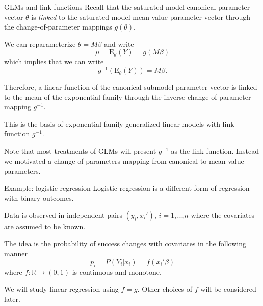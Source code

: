 \documentclass[
  ignorenonframetext,
]{beamer}
\begin{document}
\begin{frame}{GLMs and link functions}
\protect\hypertarget{glms-and-link-functions}{}
Recall that the saturated model canonical parameter vector \(\theta\) is
\emph{linked} to the saturated model mean value parameter vector through
the change-of-parameter mappings \(g(\theta)\).

\vspace{12pt}

We can reparameterize \(\theta = M\beta\) and write \[
 \mu = \text{E}_\theta(Y) = g(M\beta) 
\] which implies that we can write \[
  g^{-1}\left(\text{E}_\theta(Y)\right) = M\beta.
\]
\end{frame}

\begin{frame}{}
\protect\hypertarget{section-4}{}
Therefore, a linear function of the canonical submodel parameter vector
is linked to the mean of the exponential family through the inverse
change-of-parameter mapping \(g^{-1}\).

\vspace{12pt}

This is the basis of exponential family generalized linear models with
link function \(g^{-1}\).

\vspace{12pt}

Note that most treatments of GLMs will present \(g^{-1}\) as the link
function. Instead we motivated a change of parameters mapping from
canonical to mean value parameters.
\end{frame}

\begin{frame}{Example: logistic regression}
\protect\hypertarget{example-logistic-regression}{}
Logistic regression is a different form of regression with binary
outcomes.

\vspace{12pt}

Data is observed in independent pairs \((y_i,x_i')\),
\(i = 1\),\(\ldots\),\(n\) where the covariates are assumed to be known.

\vspace{12pt}

The idea is the probability of success changes with covariates in the
following manner \[
  p_i = P(Y_i|x_i) = f(x_i'\beta)
\] where \(f:\mathbb{R}\to (0,1)\) is continuous and monotone.

\vspace{12pt}

We will study linear regression using \(f = g\). Other choices of \(f\)
will be considered later.
\end{frame}
\end{document}
